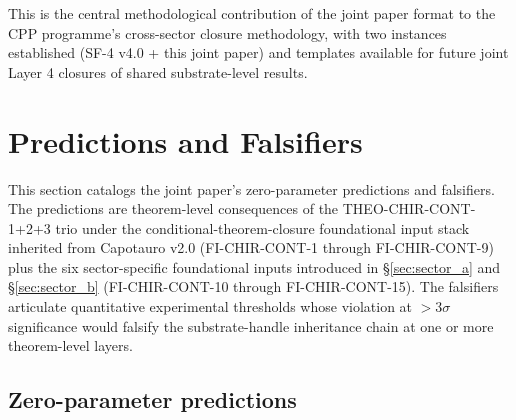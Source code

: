 \documentclass[11pt,letterpaper]{article}
\begin{document}
This is the central methodological contribution of the joint paper format to the CPP programme's cross-sector closure methodology, with two instances established (SF-4 v4.0 + this joint paper) and templates available for future joint Layer 4 closures of shared substrate-level results.

\section{Predictions and Falsifiers}
\label{sec:predictions}

This section catalogs the joint paper's zero-parameter predictions and falsifiers. The predictions are theorem-level consequences of the THEO-CHIR-CONT-1+2+3 trio under the conditional-theorem-closure foundational input stack inherited from Capotauro v2.0 (FI-CHIR-CONT-1 through FI-CHIR-CONT-9) plus the six sector-specific foundational inputs introduced in §\ref{sec:sector_a} and §\ref{sec:sector_b} (FI-CHIR-CONT-10 through FI-CHIR-CONT-15). The falsifiers articulate quantitative experimental thresholds whose violation at $>3\sigma$ significance would falsify the substrate-handle inheritance chain at one or more theorem-level layers.

\subsection{Zero-parameter predictions}
\label{sec:zero_parameter_predictions}
\end{document}
